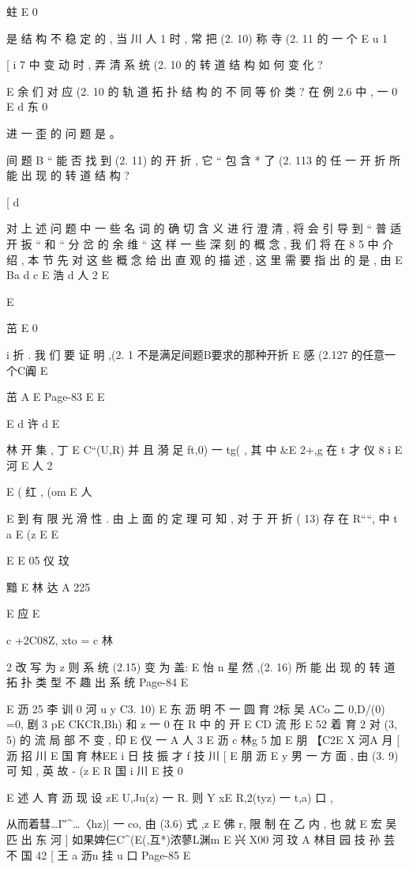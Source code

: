 {{{蛀 E 0

是 结 构 不 稳 定 的 , 当 川 人 1 时 , 常 把 (2. 10) 称 寺 (2. 11 的 一 个
E u 1

[ i
7 中 变 动 时 , 弄 清 系 统 (2. 10 的 转 道 结 构 如 何 变 化 ?

E 余
们 对 应 (2. 10 的 轨 道 拓 扑 结 构 的 不 同 等 价 类 ? 在 例 2.6 中 , 一 0
E d 东
0

进 一 歪 的 问 题 是 。

间 题 B “ 能 否 找 到 (2. 11) 的 开 折 , 它 “ 包 含 * 了 (2. 113 的 任 一
开 折 所 能 出 现 的 转 道 结 构 ?

[
d

对 上 述 问 题 中 一 些 名 词 的 确 切 含 义 进 行 澄 清 , 将 会 引 导 到 “ 普
适 开 扳 “ 和 “ 分 岔 的 余 维 “ 这 样 一 些 深 刻 的 概 念 , 我 们 将 在 8 5 中
介 绍 , 本 节 先 对 这 些 概 念 给 出 直 观 的 描 述 , 这 里 需 要 指 出 的 是 , 由
E
Ba d c
E 浩 d 人 2
E

E

茁 E 0

i
折 . 我 们 要 证 明 ,(2. 1 不是满足间题B要求的那种开折 E
感 (2.127 的任意一个C阗 E

茁 A E
Page-83
E E

E d 许
d
E

林
开 集 , 丁 E C“(U,R) 并 且 漪 足 ft,0) 一 tg( , 其 中 &E 2+,g 在
t 才
仪 8 i
E 河
E 人 2

E ( 红 , (om E 人

E
到 有 限 光 滑 性 . 由 上 面 的 定 理 可 知 , 对 于 开 折 ( 13) 存 在 R““, 中
t a
E (z E
E

E
E 05 仪
玟

黯 E 林 达 A 225

E 应
E

c
+2C08Z, xto = c 林

2 改 写 为 z 则 系 统 (2.15) 变 为
盖: E 怡 n
星 然 ,(2. 16) 所 能 出 现 的 转 道 拓 扑 类 型 不 趣 出 系 统
Page-84
E

E 沥 25 李 训 0 河
u y C3. 10)
E 东 沥 明 不 一 圆 育 2标 吴
ACo 二 0,D/(0) =0, 剧 3 pE CKCR,Bh) 和 z 一 0 在 R 中 的 开
E
CD 流 形
E 52 着 育 2
对 (3, 5) 的 流 局 部 不 变 , 印
E 仪 一 A 人 3
E 沥 c 林g 5 加
E 朋
【C2E X 河A 月
[ 沥 招 川
E 国 育 林EE i 日 技 振 才 f 技 川 [
E 朋
沥
E y
男 一 方 面 , 由 (3. 9) 可 知 , 英 故 - (z E R 国 i 川
E 技 0

E 述 人 育 沥
现 设 zE U,Ju(z) 一 R. 则 Y xE R,2(tyz) 一 t,a) 口 ,

从而着彗…I″^…〈hz)| 一 co, 由 (3.6) 式 ,z E 佛 r, 限 制 在 乙 内 , 也 就
E 宏 吴
匹 出 东 河 ] 如果婢仨C^(E(,互*)浓蓼L渊m E 兴 X00 河 玟
A 林目 园 技 孙 芸 不
国 42
[ 王 a 沥n 挂 u 口
Page-85
E

}}}
